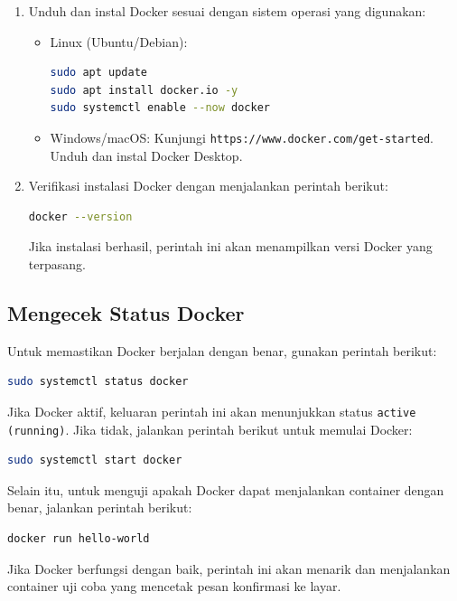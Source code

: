 \begin{enumerate}
\item Unduh dan instal Docker sesuai dengan sistem operasi yang digunakan:
\begin{itemize}
\item Linux (Ubuntu/Debian):
\begin{lstlisting}[language=bash]
sudo apt update
sudo apt install docker.io -y
sudo systemctl enable --now docker
\end{lstlisting}

\item Windows/macOS: Kunjungi \texttt{https://www.docker.com/get-started}. Unduh dan instal Docker Desktop.
\end{itemize}

\item Verifikasi instalasi Docker dengan menjalankan perintah berikut:
\begin{lstlisting}[language=bash]
docker --version
\end{lstlisting}
Jika instalasi berhasil, perintah ini akan menampilkan versi Docker yang terpasang.
\end{enumerate}

\subsection{Mengecek Status Docker}

Untuk memastikan Docker berjalan dengan benar, gunakan perintah berikut:

\begin{lstlisting}[language=bash]
sudo systemctl status docker
\end{lstlisting}

Jika Docker aktif, keluaran perintah ini akan menunjukkan status \texttt{active (running)}. Jika tidak, jalankan perintah berikut untuk memulai Docker:

\begin{lstlisting}[language=bash]
sudo systemctl start docker
\end{lstlisting}

Selain itu, untuk menguji apakah Docker dapat menjalankan container dengan benar, jalankan perintah berikut:

\begin{lstlisting}[language=bash]
docker run hello-world
\end{lstlisting}

Jika Docker berfungsi dengan baik, perintah ini akan menarik dan menjalankan container uji coba yang mencetak pesan konfirmasi ke layar.

